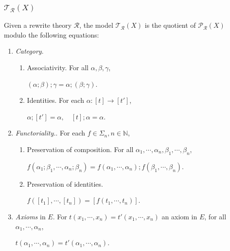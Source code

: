 \documentclass{beamer}
\begin{document}
\begin{frame}[allowframebreaks]
    \scriptsize
    \frametitle{$\mathcal{T_R}(X)$}
    Given a rewrite theory $\mathcal{R}$, the model $\mathcal{T_R}(X)$ is the quotient of 
    $\mathcal{P_R}(X)$ modulo the following equations:
    
    \begin{enumerate}
        \item \emph{Category}.
        \begin{enumerate}[a]
            \scriptsize
            \item Associativity. For all $\alpha,\beta,\gamma$,
            
            $(\alpha;\beta);\gamma = \alpha;(\beta;\gamma).$
            \item Identities. For each $\alpha: [t] \rightarrow [t']$,
            
            $\alpha;[t'] = \alpha,\quad [t];\alpha=\alpha.$
        \end{enumerate}
        \item \emph{Functoriality.}. For each $f \in \Sigma_n, n \in \mathbb{N}$,
        \begin{enumerate}[a]
            \scriptsize
            \item Preservation of composition. For all $\alpha_1,\cdots,\alpha_n,\beta_1,\cdots,\beta_n$,
            
            $f(\alpha_1;\beta_1,\cdots,\alpha_n;\beta_n) = f(\alpha_1,\cdots,\alpha_n);f(\beta_1,\cdots,\beta_n). $
            \item Preservation of identities.
            
            $ f([t_1],\cdots,[t_n])=[f(t_1,\cdots,t_n)].$
        \end{enumerate}
        \item \emph{Axioms} in $E$. For $t(x_1,\cdots,x_n)=t'(x_1,\cdots,x_n)$ an axiom in $E$, for all $\alpha_1,\cdots,\alpha_n$,
        
        $ t(\alpha_1,\cdots,\alpha_n)=t'(\alpha_1,\cdots,\alpha_n).$


\end{enumerate}
\end{frame}
\end{document}
